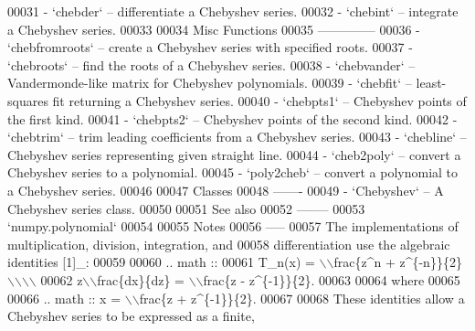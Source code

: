 \begin{DoxyCode}
00031 \textcolor{stringliteral}{- `chebder` -- differentiate a Chebyshev series.}
00032 \textcolor{stringliteral}{- `chebint` -- integrate a Chebyshev series.}
00033 \textcolor{stringliteral}{}
00034 \textcolor{stringliteral}{Misc Functions}
00035 \textcolor{stringliteral}{--------------}
00036 \textcolor{stringliteral}{- `chebfromroots` -- create a Chebyshev series with specified roots.}
00037 \textcolor{stringliteral}{- `chebroots` -- find the roots of a Chebyshev series.}
00038 \textcolor{stringliteral}{- `chebvander` -- Vandermonde-like matrix for Chebyshev polynomials.}
00039 \textcolor{stringliteral}{- `chebfit` -- least-squares fit returning a Chebyshev series.}
00040 \textcolor{stringliteral}{- `chebpts1` -- Chebyshev points of the first kind.}
00041 \textcolor{stringliteral}{- `chebpts2` -- Chebyshev points of the second kind.}
00042 \textcolor{stringliteral}{- `chebtrim` -- trim leading coefficients from a Chebyshev series.}
00043 \textcolor{stringliteral}{- `chebline` -- Chebyshev series representing given straight line.}
00044 \textcolor{stringliteral}{- `cheb2poly` -- convert a Chebyshev series to a polynomial.}
00045 \textcolor{stringliteral}{- `poly2cheb` -- convert a polynomial to a Chebyshev series.}
00046 \textcolor{stringliteral}{}
00047 \textcolor{stringliteral}{Classes}
00048 \textcolor{stringliteral}{-------}
00049 \textcolor{stringliteral}{- `Chebyshev` -- A Chebyshev series class.}
00050 \textcolor{stringliteral}{}
00051 \textcolor{stringliteral}{See also}
00052 \textcolor{stringliteral}{--------}
00053 \textcolor{stringliteral}{`numpy.polynomial`}
00054 \textcolor{stringliteral}{}
00055 \textcolor{stringliteral}{Notes}
00056 \textcolor{stringliteral}{-----}
00057 \textcolor{stringliteral}{The implementations of multiplication, division, integration, and}
00058 \textcolor{stringliteral}{differentiation use the algebraic identities [1]\_:}
00059 \textcolor{stringliteral}{}
00060 \textcolor{stringliteral}{.. math ::}
00061 \textcolor{stringliteral}{    T\_n(x) = \(\backslash\)\(\backslash\)frac\{z^n + z^\{-n\}\}\{2\} \(\backslash\)\(\backslash\)\(\backslash\)\(\backslash\)}
00062 \textcolor{stringliteral}{    z\(\backslash\)\(\backslash\)frac\{dx\}\{dz\} = \(\backslash\)\(\backslash\)frac\{z - z^\{-1\}\}\{2\}.}
00063 \textcolor{stringliteral}{}
00064 \textcolor{stringliteral}{where}
00065 \textcolor{stringliteral}{}
00066 \textcolor{stringliteral}{.. math :: x = \(\backslash\)\(\backslash\)frac\{z + z^\{-1\}\}\{2\}.}
00067 \textcolor{stringliteral}{}
00068 \textcolor{stringliteral}{These identities allow a Chebyshev series to be expressed as a finite,}

\end{DoxyCode}
